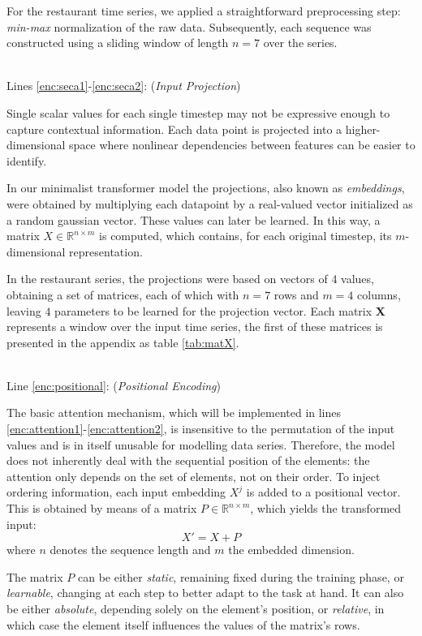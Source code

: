 \documentclass[algorithms,article,submit,pdftex,moreauthors]{Definitions/mdpi}
\begin{document}
For the restaurant time series, we applied a straightforward preprocessing step: \textit{min-max} normalization of the raw data. Subsequently, each sequence was constructed using a sliding window of length $n = 7$ over the series.

~\\Lines \ref{enc:seca1}-\ref{enc:seca2}: (\textit{Input Projection})

Single scalar values for each single timestep may not be expressive enough to capture contextual information. Each data point is projected into a higher-dimensional space where nonlinear dependencies between features can be easier to identify. 

In our minimalist transformer model the projections, also known as {\em embeddings}, were obtained by multiplying each datapoint by a real-valued vector initialized as a random gaussian vector. These values can later be learned. In this way, a matrix $X \in \mathbb{R}^{n\times m}$ is computed, which contains, for each original timestep, its $m$-dimensional representation.

In the restaurant series, the projections were based on vectors of 4 values, obtaining a set of matrices, each of which with $n=7$ rows and $m=4$ columns, leaving $4$ parameters to be learned for the projection vector. Each matrix {\bf X} represents a window over the input time series, the first of these matrices is presented in the appendix as table \ref{tab:matX}.

~\\Line \ref{enc:positional}: (\textit{Positional Encoding})

The basic attention mechanism, which will be implemented in lines \ref{enc:attention1}-\ref{enc:attention2}, is insensitive to the permutation of the input values \cite{VSPU17} and is in itself unusable for modelling data series. Therefore, the model does not inherently deal with the sequential position of the elements: the attention only depends on the set of elements, not on their order. To inject ordering information, each input embedding $X^j$ is added to a positional vector. 
This is obtained by means of a matrix $P \in \mathbb{R}^{n \times m}$, which yields the transformed input: 
\begin{equation}
    X' = X + P
\end{equation}
where $n$ denotes the sequence length and $m$ the embedded dimension.

The matrix $P$ can be either \textit{static}, remaining fixed during the training phase, or \textit{learnable}, changing at each step to better adapt to the task at hand. It can also be either \textit{absolute}, depending solely on the element's position, or \textit{relative}, in which case the element itself influences the values of the matrix's rows. 
\end{document}
